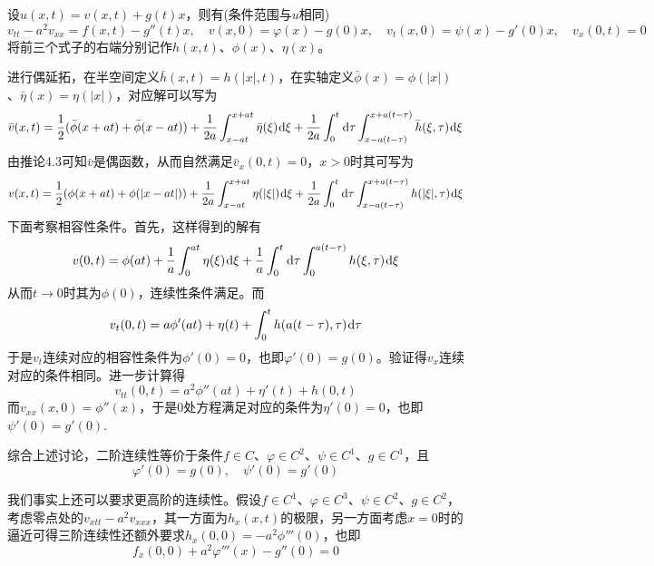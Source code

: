 \documentclass[a4paper,UTF8,fontset=windows,10pt]{ctexart}
\newcommand*{\dr}{\hspace{0.07em}\mathrm{d}}
\begin{document}
\begin{enumerate}
    设$u(x,t)=v(x,t)+g(t)x$，则有(条件范围与$u$相同)
    $$v_{tt}-a^2v_{xx}=f(x,t)-g''(t)x,\quad v(x,0)=\varphi(x)-g(0)x,\quad v_t(x,0)=\psi(x)-g'(0)x,\quad v_x(0,t)=0$$
    将前三个式子的右端分别记作$h(x,t)$、$\phi(x)$、$\eta(x)$。
    
    进行偶延拓，在半空间定义$\bar{h}(x,t)=h(|x|,t)$，在实轴定义$\bar{\phi}(x)=\phi(|x|)$、$\bar{\eta}(x)=\eta(|x|)$，对应解可以写为
    $$\bar{v}(x,t)=\frac{1}{2}(\bar{\phi}(x+at)+\bar{\phi}(x-at))+\frac{1}{2a}\int_{x-at}^{x+at}\bar{\eta}(\xi)\dr\xi+\frac{1}{2a}\int_0^t\dr\tau\int_{x-a(t-\tau)}^{x+a(t-\tau)}\bar{h}(\xi,\tau)\dr\xi$$
    由推论4.3可知$\bar{v}$是偶函数，从而自然满足$\bar{v}_x(0,t)=0$，$x>0$时其可写为
    $$v(x,t)=\frac{1}{2}(\phi(x+at)+\phi(|x-at|))+\frac{1}{2a}\int_{x-at}^{x+at}\eta(|\xi|)\dr\xi+\frac{1}{2a}\int_0^t\dr\tau\int_{x-a(t-\tau)}^{x+a(t-\tau)}h(|\xi|,\tau)\dr\xi$$
    下面考察相容性条件。首先，这样得到的解有
    $$v(0,t)=\phi(at)+\frac{1}{a}\int_0^{at}\eta(\xi)\dr\xi+\frac{1}{a}\int_0^t\dr\tau\int_0^{a(t-\tau)}h(\xi,\tau)\dr\xi$$
    从而$t\to0$时其为$\phi(0)$，连续性条件满足。而
    $$v_t(0,t)=a\phi'(at)+\eta(t)+\int_0^t h(a(t-\tau),\tau)\dr\tau$$
    于是$v_t$连续对应的相容性条件为$\phi'(0)=0$，也即$\varphi'(0)=g(0)$。验证得$v_x$连续对应的条件相同。进一步计算得
    $$v_{tt}(0,t)=a^2\phi''(at)+\eta'(t)+h(0,t)$$
    而$v_{xx}(x,0)=\phi''(x)$，于是0处方程满足对应的条件为$\eta'(0)=0$，也即$\psi'(0)=g'(0)$.
    
    综合上述讨论，二阶连续性等价于条件$f\in C$、$\varphi\in C^2$、$\psi\in C^1$、$g\in C^1$，且
    $$\varphi'(0)=g(0),\quad\psi'(0)=g'(0)$$
    
    我们事实上还可以要求更高阶的连续性。假设$f\in C^1$、$\varphi\in C^3$、$\psi\in C^2$、$g\in C^2$，考虑零点处的$v_{xtt}-a^2v_{xxx}$，其一方面为$h_x(x,t)$的极限，另一方面考虑$x=0$时的逼近可得三阶连续性还额外要求$h_x(0,0)=-a^2\phi'''(0)$，也即
    $$f_x(0,0)+a^2\varphi'''(x)-g''(0)=0$$    
\end{enumerate}
\end{document}
